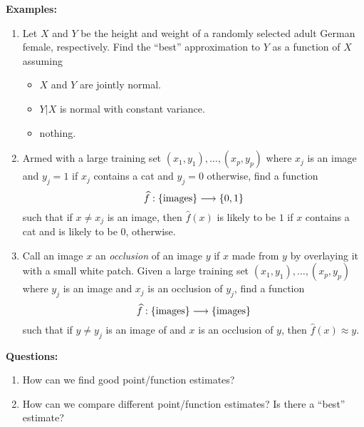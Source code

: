 \documentclass[12pt]{amsart}
\begin{document}
\textbf{Examples:}
\begin{enumerate}
\item Let $X$ and $Y$ be the height and weight of a randomly selected adult German female, respectively.
Find the ``best'' approximation to $Y$  as a function of $X$ assuming
\begin{itemize}
    \item $X$ and $Y$ are jointly normal.
    \item $Y|X$ is normal with constant variance.
    \item nothing.
\end{itemize}


\item Armed with a large training set $(x_1, y_1),\ldots,(x_p, y_p)$ where $x_j$ is an image and
$y_j=1$ if $x_j$ contains a cat and $y_j=0$ otherwise, find a function
\[
    \widehat{f}:\{\text{images}\}\longrightarrow \{0,1\}
\]
such that if $x\neq x_j$ is an image, then $\hat f(x)$ is likely to be $1$ if $x$ contains a cat and is likely to be $0$, otherwise.
\item Call an image $x$ an \emph{occlusion} of an image $y$ if $x$ made from $y$ by overlaying it with a small white patch.
Given a large training set $(x_1, y_1),\ldots,(x_p, y_p)$ where $y_j$ is an image and $x_j$ is an occlusion of $y_j$,
find a function
$$
\widehat{f}:\{\text{images}\}\longrightarrow \{\text{images}\}
$$
such that if $y\neq y_j$ is an image of and $x$ is an occlusion of $y$, then $\hat f(x)\approx y$.
\end{enumerate}

\textbf{Questions:}
\begin{enumerate}
    \item How can we find good point/function estimates?
    \item How can we compare different point/function estimates? Is there a ``best'' estimate?
\end{enumerate}
\end{document}
